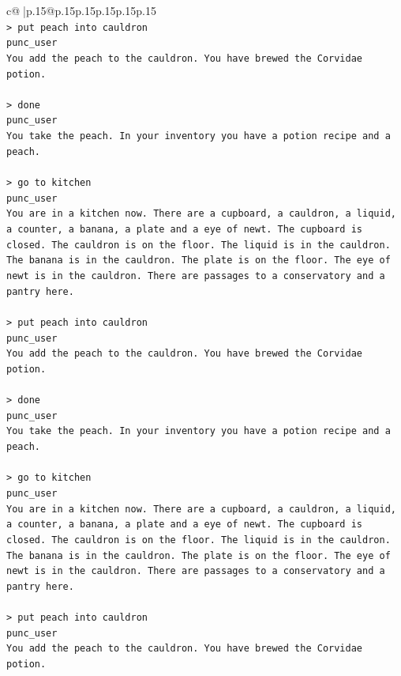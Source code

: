 \documentclass{article}
\begin{document}
{\begin{supertabular}{c@{$\;$}|p{.15\linewidth}@{}p{.15\linewidth}p{.15\linewidth}p{.15\linewidth}p{.15\linewidth}p{.15\linewidth}}
{{{\\ 
\texttt{> put peach into cauldron} \\
\texttt{punc\_user} \\
\texttt{You add the peach to the cauldron. You have brewed the Corvidae potion.} \\
\\ 
\texttt{> done } \\
\texttt{punc\_user} \\
\texttt{You take the peach. In your inventory you have a potion recipe and a peach.} \\
\\ 
\texttt{> go to kitchen} \\
\texttt{punc\_user} \\
\texttt{You are in a kitchen now. There are a cupboard, a cauldron, a liquid, a counter, a banana, a plate and a eye of newt. The cupboard is closed. The cauldron is on the floor. The liquid is in the cauldron. The banana is in the cauldron. The plate is on the floor. The eye of newt is in the cauldron. There are passages to a conservatory and a pantry here.} \\
\\ 
\texttt{> put peach into cauldron} \\
\texttt{punc\_user} \\
\texttt{You add the peach to the cauldron. You have brewed the Corvidae potion.} \\
\\ 
\texttt{> done } \\
\texttt{punc\_user} \\
\texttt{You take the peach. In your inventory you have a potion recipe and a peach.} \\
\\ 
\texttt{> go to kitchen} \\
\texttt{punc\_user} \\
\texttt{You are in a kitchen now. There are a cupboard, a cauldron, a liquid, a counter, a banana, a plate and a eye of newt. The cupboard is closed. The cauldron is on the floor. The liquid is in the cauldron. The banana is in the cauldron. The plate is on the floor. The eye of newt is in the cauldron. There are passages to a conservatory and a pantry here.} \\
\\ 
\texttt{> put peach into cauldron} \\
\texttt{punc\_user} \\
\texttt{You add the peach to the cauldron. You have brewed the Corvidae potion.} \\
}}}
\end{supertabular}}
\end{document}
